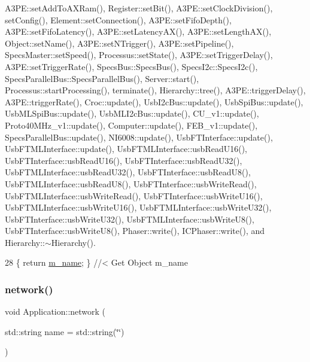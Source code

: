 A3\+P\+E\+::set\+Add\+To\+A\+X\+Ram(), Register\+::set\+Bit(), A3\+P\+E\+::set\+Clock\+Division(), set\+Config(), Element\+::set\+Connection(), A3\+P\+E\+::set\+Fifo\+Depth(), A3\+P\+E\+::set\+Fifo\+Latency(), A3\+P\+E\+::set\+Latency\+A\+X(), A3\+P\+E\+::set\+Length\+A\+X(), Object\+::set\+Name(), A3\+P\+E\+::set\+N\+Trigger(), A3\+P\+E\+::set\+Pipeline(), Specs\+Master\+::set\+Speed(), Processus\+::set\+State(), A3\+P\+E\+::set\+Trigger\+Delay(), A3\+P\+E\+::set\+Trigger\+Rate(), Specs\+Bus\+::\+Specs\+Bus(), Specs\+I2c\+::\+Specs\+I2c(), Specs\+Parallel\+Bus\+::\+Specs\+Parallel\+Bus(), Server\+::start(), Processus\+::start\+Processing(), terminate(), Hierarchy\+::tree(), A3\+P\+E\+::trigger\+Delay(), A3\+P\+E\+::trigger\+Rate(), Croc\+::update(), Usb\+I2c\+Bus\+::update(), Usb\+Spi\+Bus\+::update(), Usb\+M\+L\+Spi\+Bus\+::update(), Usb\+M\+L\+I2c\+Bus\+::update(), C\+U\+\_\+v1\+::update(), Proto40\+M\+Hz\+\_\+v1\+::update(), Computer\+::update(), F\+E\+B\+\_\+v1\+::update(), Specs\+Parallel\+Bus\+::update(), N\+I6008\+::update(), Usb\+F\+T\+Interface\+::update(), Usb\+F\+T\+M\+L\+Interface\+::update(), Usb\+F\+T\+M\+L\+Interface\+::usb\+Read\+U16(), Usb\+F\+T\+Interface\+::usb\+Read\+U16(), Usb\+F\+T\+Interface\+::usb\+Read\+U32(), Usb\+F\+T\+M\+L\+Interface\+::usb\+Read\+U32(), Usb\+F\+T\+Interface\+::usb\+Read\+U8(), Usb\+F\+T\+M\+L\+Interface\+::usb\+Read\+U8(), Usb\+F\+T\+Interface\+::usb\+Write\+Read(), Usb\+F\+T\+M\+L\+Interface\+::usb\+Write\+Read(), Usb\+F\+T\+Interface\+::usb\+Write\+U16(), Usb\+F\+T\+M\+L\+Interface\+::usb\+Write\+U16(), Usb\+F\+T\+M\+L\+Interface\+::usb\+Write\+U32(), Usb\+F\+T\+Interface\+::usb\+Write\+U32(), Usb\+F\+T\+M\+L\+Interface\+::usb\+Write\+U8(), Usb\+F\+T\+Interface\+::usb\+Write\+U8(), Phaser\+::write(), I\+C\+Phaser\+::write(), and Hierarchy\+::$\sim$\+Hierarchy().


\begin{DoxyCode}
28 \{ \textcolor{keywordflow}{return} \hyperlink{classObject_a8b83c95c705d2c3ba0d081fe1710f48d}{m\_name}; \} \textcolor{comment}{//< Get Object m\_name}
\end{DoxyCode}
\mbox{\label{classApplication_ab21cc0c86ca4e63d1fbd348d709dcddc}} 
\subsubsection{\texorpdfstring{network()}{network()}}
{\footnotesize\ttfamily void Application\+::network (\begin{DoxyParamCaption}\item[{std\+::string}]{name = {\ttfamily std\+:\+:string(\char`\"{}\char`\"{})} }\end{DoxyParamCaption})}



